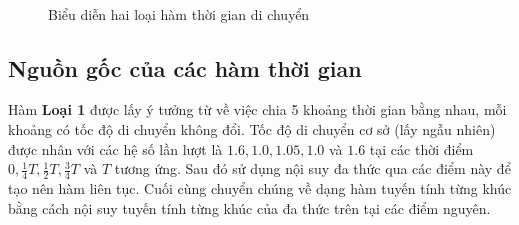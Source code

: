 \documentclass[../main.tex]{subfiles}
\begin{document}
\begin{figure}
  \centering

  \\


  \caption{Biểu diễn hai loại hàm thời gian di chuyển}
  \label{fig:11}
\end{figure}

\subsection{Nguồn gốc của các hàm thời
gian}\label{nguux1ed3n-gux1ed1c-cux1ee7a-cuxe1c-huxe0m-thux1eddi-gian}

Hàm \textbf{Loại 1} được lấy ý tưởng từ \cite{figliozzi2012time} về
việc chia 5 khoảng thời gian bằng nhau, mỗi khoảng có tốc độ di chuyển
không đổi. Tốc độ di chuyển cơ sở (lấy ngẫu nhiên) được nhân với các hệ
số lần lượt là \(1.6, 1.0, 1.05, 1.0\) và \(1.6\) tại các thời điểm
\(0, \frac 1 4 T, \frac 1 2 T, \frac 3 4 T\) và \(T\) tương ứng. Sau đó sử dụng nội suy đa
thức qua các điểm này để tạo nên hàm liên tục. Cuối cùng chuyển chúng về
dạng hàm tuyến tính từng khúc bằng cách nội suy tuyến tính từng khúc của
đa thức trên tại các điểm nguyên.
\end{document}
